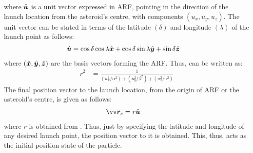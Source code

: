 where $\hat{\bm{u}}$ is a unit vector expressed in \gls{ARF}, pointing in the direction of the launch location from the asteroid's centre, with components $(u_x, u_y, u_z)$. The unit vector can be stated in terms of the latitude $(\delta)$ and longitude $(\lambda)$ of the launch point as follows:
\begin{align}
    \hat{\bm{u}} &= \cos\delta \cos\lambda \hat{\bm{x}} + \cos\delta \sin\lambda \hat{\bm{y}} + \sin\delta \hat{\bm{z}}
\end{align}
where $(\hat{\bm{x}},\hat{\bm{y}},\hat{\bm{z}})$ are the basis vectors forming the \gls{ARF}. Thus,  can be written as:
\begin{align}
    r^2 &= \frac{1}{ (u_x^2/\alpha^2) + (u_y^2/\beta^2) + (u_z^2/\gamma^2) }
    \label{eqn:launch_loc_r_square_expanded}
\end{align}
The final position vector to the launch location, from the origin of \gls{ARF} or the asteroid's centre, is given as follows:
\begin{align}
    \bv{r}_s &= r\buvec{u}
    \label{eqn:launch_vector}
\end{align}
where $r$ is obtained from . Thus, just by specifying the latitude and longitude of any desired launch point, the position vector to it is obtained. This, thus, acts as the initial position state of the particle.

